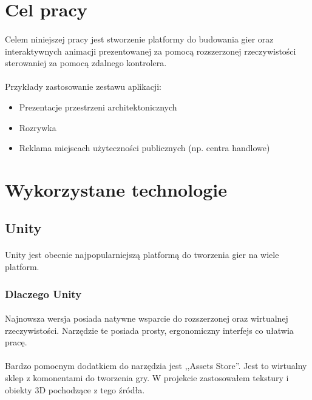 \documentclass[12pt]{article}
\begin{document}
{\section{Cel pracy}
\paragraph{}
Celem niniejszej pracy jest stworzenie platformy do budowania gier oraz interaktywnych animacji prezentowanej za pomocą rozszerzonej rzeczywistości sterowaniej za pomocą zdalnego kontrolera.

\paragraph{}
Przykłady zastosowanie zestawu aplikacji:

\begin{itemize}
\item Prezentacje przestrzeni architektonicznych
\item Rozrywka
\item Reklama miejscach użyteczności publicznych (np. centra handlowe)
\end{itemize}



\section{Wykorzystane technologie}

\subsection{Unity}
\paragraph{}
Unity jest obecnie najpopularniejszą platformą do tworzenia gier na wiele platform. 
\subsubsection{Dlaczego Unity}
\paragraph{}
Najnowsza wersja posiada natywne wsparcie do rozszerzonej oraz wirtualnej rzeczywistości. Narzędzie te posiada prosty, ergonomiczny interfejs co ułatwia pracę.
\paragraph{}
Bardzo pomocnym dodatkiem do narzędzia jest ,,Assets Store''. Jest to wirtualny sklep z komonentami do tworzenia gry. W projekcie zastosowałem tekstury i obiekty 3D pochodzące z tego źródła.
}
\end{document}
